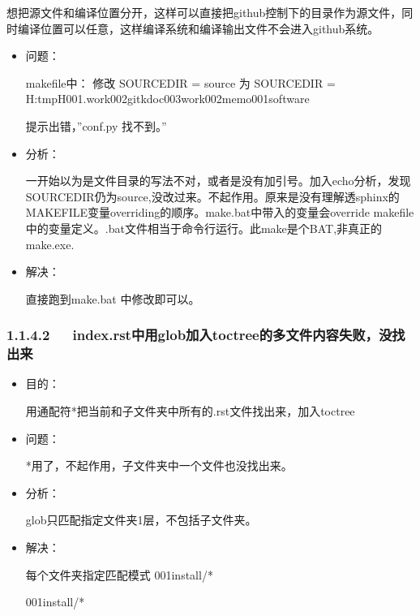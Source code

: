 \documentclass[letterpaper,12pt,english]{sphinxmanual}
\begin{document}
想把源文件和编译位置分开，这样可以直接把github控制下的目录作为源文件，同时编译位置可以任意，这样编译系统和编译输出文件不会进入github系统。
\begin{itemize}
\item {} 
问题：

\begin{sphinxVerbatim}[commandchars=\\\{\}]
makefile中：
修改
SOURCEDIR     = source
为
SOURCEDIR     = \PYGZdq{}H:\PYGZbs{}tmp\PYGZus{}H\PYGZbs{}001.work\PYGZbs{}002git\PYGZbs{}kdoc\PYGZbs{}003work\PYGZbs{}002memo\PYGZbs{}001software\PYGZdq{}
\end{sphinxVerbatim}

提示出错，”conf.py 找不到。”

\item {} 
分析：

一开始以为是文件目录的写法不对，或者是没有加引号。加入echo分析，发现SOURCEDIR仍为source,没改过来。不起作用。原来是没有理解透sphinx的MAKEFILE变量overriding的顺序。make.bat中带入的变量会override makefile中的变量定义。.bat文件相当于命令行运行。此make是个BAT,非真正的make.exe.

\item {} 
解决：

直接跑到make.bat 中修改即可以。

\end{itemize}


\subsubsection{1.1.4.2   index.rst中用glob加入toctree的多文件内容失败，没找出来}
\label{\detokenize{001software/001install/sphinx:index-rstglobtoctree}}\begin{itemize}
\item {} 
目的：

用通配符*把当前和子文件夹中所有的.rst文件找出来，加入toctree

\item {} 
问题：

*用了，不起作用，子文件夹中一个文件也没找出来。

\item {} 
分析：

glob只匹配指定文件夹1层，不包括子文件夹。

\item {} 
解决：

每个文件夹指定匹配模式
001install/*

001install/*

\end{itemize}
\end{document}
